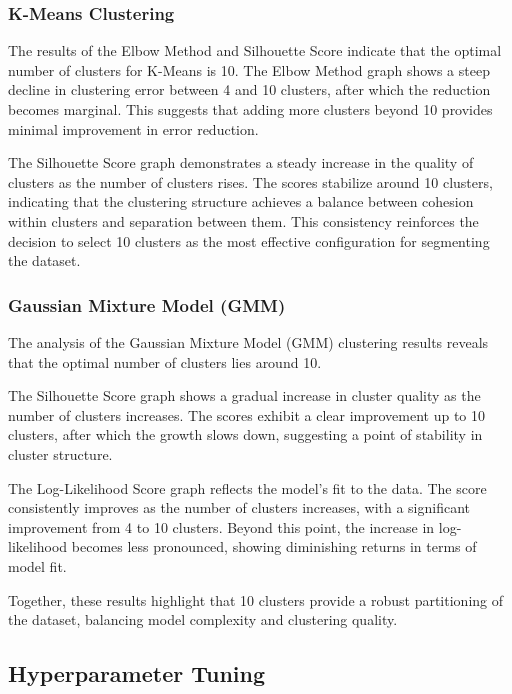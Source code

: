         \subsubsection{K-Means Clustering \\}
        
            The results of the Elbow Method and Silhouette Score indicate that the optimal number of clusters for K-Means is 10. The Elbow Method graph shows a steep decline in clustering error between 4 and 10 clusters, after which the reduction becomes marginal. This suggests that adding more clusters beyond 10 provides minimal improvement in error reduction.

            The Silhouette Score graph demonstrates a steady increase in the quality of clusters as the number of clusters rises. The scores stabilize around 10 clusters, indicating that the clustering structure achieves a balance between cohesion within clusters and separation between them. This consistency reinforces the decision to select 10 clusters as the most effective configuration for segmenting the dataset.

        
        \subsubsection{Gaussian Mixture Model (GMM) \\}

        The analysis of the Gaussian Mixture Model (GMM) clustering results reveals that the optimal number of clusters lies around 10.

        The Silhouette Score graph shows a gradual increase in cluster quality as the number of clusters increases. The scores exhibit a clear improvement up to 10 clusters, after which the growth slows down, suggesting a point of stability in cluster structure.
        
        The Log-Likelihood Score graph reflects the model's fit to the data. The score consistently improves as the number of clusters increases, with a significant improvement from 4 to 10 clusters. Beyond this point, the increase in log-likelihood becomes less pronounced, showing diminishing returns in terms of model fit.
        
        Together, these results highlight that 10 clusters provide a robust partitioning of the dataset, balancing model complexity and clustering quality.        
            

    \subsection{Hyperparameter Tuning}
    
